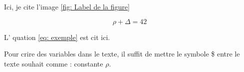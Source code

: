 \documentclass{article}
\begin{document}
Ici, je cite l'image \ref{fig: Label de la figure}



\begin{equation} \label{eq: exemple}
\rho + \Delta = 42
\end{equation}

L' quation \ref{eq: exemple} est cit  ici. 


Pour  crire des variables dans le texte, il suffit de mettre le symbole \$ entre le texte souhait  comme : constante $\rho$.
\end{document}
